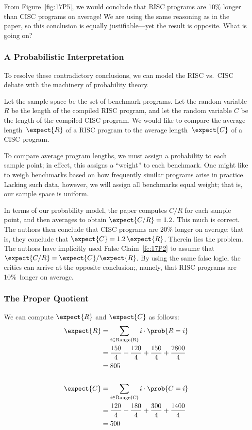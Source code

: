 From Figure~\ref{fig:17P5}, we would conclude that RISC programs are
10\% longer than CISC programs on average!  We are using the same
reasoning as in the paper, so this conclusion is equally
justifiable---yet the result is opposite.  What is going on?

\subsubsection{A Probabilistic Interpretation}

To resolve these contradictory conclusions, we can model the RISC
vs.\ CISC debate with the machinery of probability theory.

Let the sample space be the set of benchmark programs.  Let the random
variable $R$ be the length of the compiled RISC program, and let the
random variable $C$ be the length of the compiled CISC program.  We would
like to compare the average length~$\expect{R}$ of a RISC program to the
average length~$\expect{C}$ of a CISC program.

To compare average program lengths, we must assign a probability to
each sample point; in effect, this assigns a ``weight'' to each
benchmark.  One might like to weigh benchmarks based on how frequently
similar programs arise in practice.  Lacking such data, however, we
will assign all benchmarks equal weight; that is, our sample space is
uniform.

In terms of our probability model, the paper computes $C / R$ for each
sample point, and then averages to obtain $\expect{C / R} = 1.2$.
This much is correct.  The authors then conclude that CISC programs
are 20\% longer on average; that is, they conclude that $\expect{C} =
1.2\, \expect{R}$.  Therein lies the problem.  The authors have
implicitly used False Claim~\ref{fc:17P2} to assume that $\expect{C/R}
= \expect{C}/\expect{R}$.  By using the same false logic, the critics
can arrive at the opposite conclusion;, namely, that RISC programs are
10\%~longer on average.


\subsubsection{The Proper Quotient}

We can compute $\expect{R}$ and $\expect{C}$ as follows:
\begin{align*}
\expect{R}  
    & = \sum_{i \in \text{Range(R)}} i \cdot \prob{R = i} \\
    & = \frac{150}{4}+\frac{120}{4}+\frac{150}{4}+\frac{2800}{4} \\
    & = 805 \\
\\
\expect{C}
    & = \sum_{i \in \text{Range(C)}} i \cdot \prob{C = i} \\
    & = \frac{120}{4}+\frac{180}{4}+\frac{300}{4}+\frac{1400}{4} \\
    & = 500
\end{align*}

